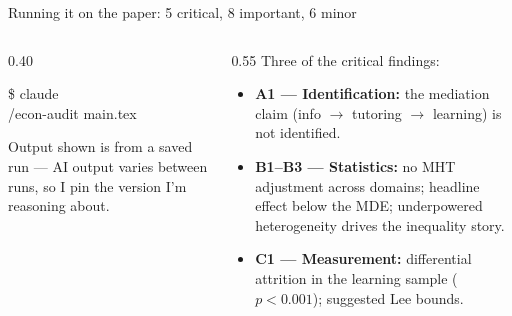 \documentclass[aspectratio=169, 10pt]{beamer}
\begin{document}
\begin{frame}[fragile]{Running it on the paper: 5 critical, 8 important, 6 minor}
\vskip-2pt
\begin{columns}[T]
\begin{column}{0.40\textwidth}
\begin{tcolorbox}[colback=DarkSlate, colframe=CoolGray!40, boxrule=0.5pt, arc=3pt,
  left=6pt, right=6pt, top=5pt, bottom=5pt]
{\color{CoolGray}\ttfamily\small\$\; claude}\\[3pt]
{\color{white}\ttfamily\small /econ-audit main.tex}
\end{tcolorbox}
\vskip4pt
{\scriptsize\color{CoolGray} Output shown is from a saved run --- AI output varies between runs, so I pin the version I'm reasoning about.}
\end{column}
\begin{column}{0.55\textwidth}
\small Three of the critical findings:
\vskip3pt
\begin{tcolorbox}[coralbox, title={\faExclamationTriangle\quad Critical}, top=3pt, bottom=3pt]
\footnotesize
\begin{itemize}\setlength{\itemsep}{2pt}
  \item \textbf{A1 --- Identification:} the mediation claim (info $\rightarrow$ tutoring $\rightarrow$ learning) is not identified.
  \item \textbf{B1--B3 --- Statistics:} no MHT adjustment across domains; headline effect below the MDE; underpowered heterogeneity drives the inequality story.
  \item \textbf{C1 --- Measurement:} differential attrition in the learning sample ($p<0.001$); suggested Lee bounds.
\end{itemize}
\end{tcolorbox}
\end{column}
\end{columns}
\end{frame}
\end{document}
